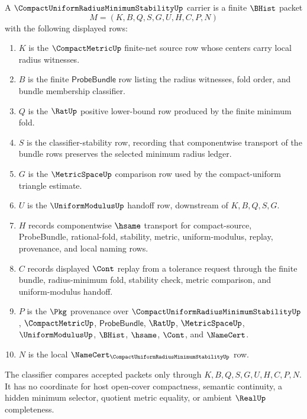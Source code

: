 \begin{definition}
\label{def:compact-uniform-radius-minimum-stability-carrier}
A $\CompactUniformRadiusMinimumStabilityUp$ carrier is a finite $\BHist$ packet
$$
M=(K,B,Q,S,G,U,H,C,P,N)
$$
with the following displayed rows:
\begin{enumerate}
\item $K$ is the $\CompactMetricUp$ finite-net source row whose centers carry local radius witnesses.
\item $B$ is the finite $\mathsf{ProbeBundle}$ row listing the radius witnesses, fold order, and bundle membership classifier.
\item $Q$ is the $\RatUp$ positive lower-bound row produced by the finite minimum fold.
\item $S$ is the classifier-stability row, recording that componentwise transport of the bundle rows preserves the selected minimum radius ledger.
\item $G$ is the $\MetricSpaceUp$ comparison row used by the compact-uniform triangle estimate.
\item $U$ is the $\UniformModulusUp$ handoff row, downstream of $K,B,Q,S,G$.
\item $H$ records componentwise $\hsame$ transport for compact-source, ProbeBundle, rational-fold, stability, metric, uniform-modulus, replay, provenance, and local naming rows.
\item $C$ records displayed $\Cont$ replay from a tolerance request through the finite bundle, radius-minimum fold, stability check, metric comparison, and uniform-modulus handoff.
\item $P$ is the $\Pkg$ provenance over $\CompactUniformRadiusMinimumStabilityUp$, $\CompactMetricUp$, $\mathsf{ProbeBundle}$, $\RatUp$, $\MetricSpaceUp$, $\UniformModulusUp$, $\BHist$, $\hsame$, $\Cont$, and $\NameCert$.
\item $N$ is the local $\NameCert_{\CompactUniformRadiusMinimumStabilityUp}$ row.
\end{enumerate}
The classifier compares accepted packets only through $K,B,Q,S,G,U,H,C,P,N$. It has no coordinate for host open-cover compactness, semantic continuity, a hidden minimum selector, quotient metric equality, or ambient $\RealUp$ completeness.
\end{definition}

